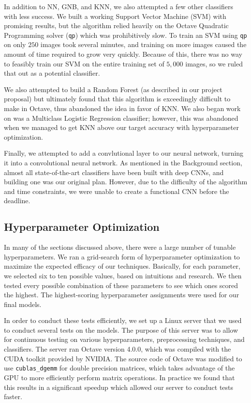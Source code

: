 \documentclass{article} %
\begin{document}
In addition to NN, GNB, and KNN, we also attempted a few other classifiers with less success. We built a working Support Vector Machine (SVM) with promising results, but the algorithm relied heavily on the Octave Quadratic Programming solver (\verb|qp|) which was prohibitively slow. To train an SVM using \verb|qp| on only $250$ images took several minutes, and training on more images caused the amount of time required to grow very quickly. Because of this, there was no way to feasibly train our SVM on the entire training set of $5,000$ images, so we ruled that out as a potential classifier.

We also attempted to build a Random Forest (as described in our project proposal) but ultimately found that this algorithm is exceedingly difficult to make in Octave, thus abandoned the idea in favor of KNN. We also began work on was a Multiclass Logistic Regression classifier; however, this was abandoned when we managed to get KNN above our target accuracy with hyperparameter optimization.

Finally, we attempted to add a convlutional layer to our neural network, turning it into a convolutional neural network. As mentioned in the Background section, almost all state-of-the-art classifiers have been built with deep CNNs, and building one was our original plan. However, due to the difficulty of the algorithm and time constraints, we were unable to create a functional CNN before the deadline.

\subsection*{Hyperparameter Optimization}

In many of the sections discussed above, there were a large number of tunable hyperparameters. We ran a grid-search form of hyperparameter optimization to maximize the expected efficacy of our techniques. Basically, for each parameter, we selected six to ten possible values, based on intuitions and research. We then tested every possible combination of these parameters to see which ones scored the highest. The highest-scoring hyperparameter assignments were used for our final models.

In order to conduct these tests efficiently, we set up a Linux server that we used to conduct several tests on the models. The purpose of this server was to allow for continuous testing on various hyperparameters, preprocessing techniques, and classifiers. The server ran Octave version 4.0.0, which was compiled with the CUDA toolkit provided by NVIDIA. The source code of Octave was modified to use \verb|cublas_dgemm| for double precision matrices, which takes advantage of the GPU to more efficiently perform matrix operations. In practice we found that this results in a significant speedup which allowed our server to conduct tests faster.
\end{document}
